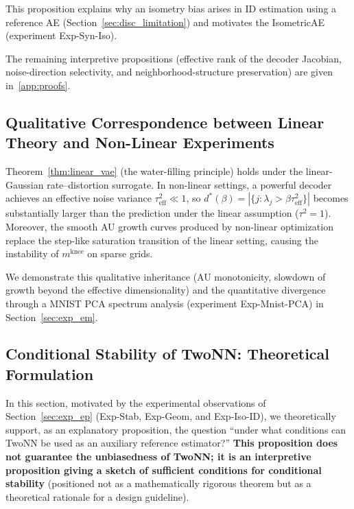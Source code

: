 \documentclass[make,article,submit,pdftex,moreauthors]{Definitions/mdpi}
\newcommand{\mknee}{m^{\mathrm{knee}}}
\begin{document}
This proposition explains why an isometry bias arises in ID estimation using a reference
AE (Section~\ref{sec:disc_limitation}) and motivates the IsometricAE
(experiment Exp-Syn-Iso).

The remaining interpretive propositions (effective rank of the decoder Jacobian,
noise-direction selectivity, and neighborhood-structure preservation) are given
in~\ref{app:proofs}.

\subsection{Qualitative Correspondence between Linear Theory and Non-Linear Experiments}\label{sec:theory_bridge}

Theorem~\ref{thm:linear_vae} (the water-filling principle) holds under the
linear-Gaussian rate--distortion surrogate.
In non-linear settings, a powerful decoder achieves an effective noise variance
$\tau^2_\mathrm{eff} \ll 1$, so
$d^*(\beta) = |\{j : \lambda_j > \beta\tau^2_\mathrm{eff}\}|$ becomes substantially
larger than the prediction under the linear assumption ($\tau^2=1$).
Moreover, the smooth AU growth curves produced by non-linear optimization replace the
step-like saturation transition of the linear setting, causing the instability of
$\mknee$ on sparse grids.

We demonstrate this qualitative inheritance (AU monotonicity, slowdown of growth beyond
the effective dimensionality) and the quantitative divergence through a MNIST PCA
spectrum analysis (experiment Exp-Mnist-PCA) in Section~\ref{sec:exp_em}.

\subsection{Conditional Stability of TwoNN: Theoretical Formulation}\label{sec:theory_stability}

In this section, motivated by the experimental observations of
Section~\ref{sec:exp_ep} (Exp-Stab, Exp-Geom, and Exp-Iso-ID),
we theoretically support, as an explanatory proposition, the question
``under what conditions can TwoNN be used as an auxiliary reference estimator?''
\textbf{This proposition does not guarantee the unbiasedness of TwoNN;
it is an interpretive proposition giving a sketch of sufficient conditions for
conditional stability}
(positioned not as a mathematically rigorous theorem but as a theoretical rationale for
a design guideline).
\end{document}
